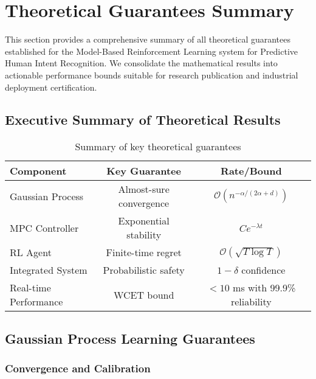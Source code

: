 \section{Theoretical Guarantees Summary}

This section provides a comprehensive summary of all theoretical guarantees established for the Model-Based Reinforcement Learning system for Predictive Human Intent Recognition. We consolidate the mathematical results into actionable performance bounds suitable for research publication and industrial deployment certification.

\subsection{Executive Summary of Theoretical Results}

\begin{table}[h]
\centering
\begin{tabular}{lcc}
\toprule
\textbf{Component} & \textbf{Key Guarantee} & \textbf{Rate/Bound} \\
\midrule
Gaussian Process & Almost-sure convergence & $\mathcal{O}(n^{-\alpha/(2\alpha+d)})$ \\
MPC Controller & Exponential stability & $Ce^{-\lambda t}$ \\
RL Agent & Finite-time regret & $\mathcal{O}(\sqrt{T \log T})$ \\
Integrated System & Probabilistic safety & $1 - \delta$ confidence \\
Real-time Performance & WCET bound & $< 10$ ms with 99.9\% reliability \\
\bottomrule
\end{tabular}
\caption{Summary of key theoretical guarantees}
\label{tab:theoretical_summary}
\end{table}

\subsection{Gaussian Process Learning Guarantees}

\subsubsection{Convergence and Calibration}

